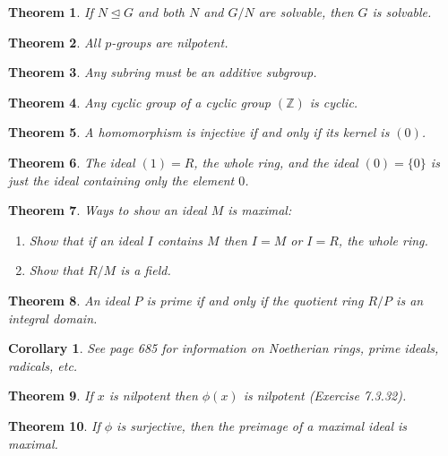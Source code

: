 \documentclass[10pt,oneside,reqno]{amsart}
\theoremstyle{plain}
\newtheorem{theorem}{Theorem}
\newtheorem{Cor}[Thm]{Corollary}
\theoremstyle{definition}
\newcommand{\norm}{\trianglelefteq}
\newcommand{\z}{\mathbb{Z}}
\begin{document}
\begin{theorem}
If $N \norm G$ and both $N$ and $G/N$ are solvable, then $G$ is solvable. 
\end{theorem}

\begin{theorem}
All $p$-groups are nilpotent. 
\end{theorem}

\begin{theorem}
Any subring must be an additive subgroup. 
\end{theorem}

\begin{theorem}
Any cyclic group of a cyclic group $(\z)$ is cyclic. 
\end{theorem}

\begin{theorem}
A homomorphism is injective if and only if its kernel is $(0)$. 
\end{theorem}

\begin{theorem}
The ideal $(1) = R$, the whole ring, and the ideal $(0) = \{0\}$ is just the ideal containing only the element $0$. 
\end{theorem}

\begin{theorem}
Ways to show an ideal $M$ is maximal: 
\begin{enumerate}
\item Show that if an ideal $I$ contains $M$ then $I = M$ or $I = R$, the whole ring. 

\item Show that $R/M$ is a field. 
\end{enumerate}
\end{theorem}

\begin{theorem}
An ideal $P$ is prime if and only if the quotient ring $R/P$ is an integral domain. 
\end{theorem}

\begin{Cor}
See page 685 for information on Noetherian rings, prime ideals, radicals, etc. 
\end{Cor}

\begin{theorem}
If $x$ is nilpotent then $\phi(x)$ is nilpotent (Exercise 7.3.32). 
\end{theorem}

\begin{theorem}
If $\phi$ is surjective, then the preimage of a maximal ideal is maximal. 
\end{theorem}
\end{document}
